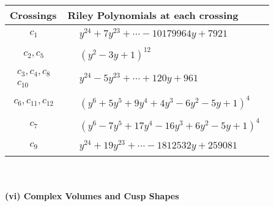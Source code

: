 \documentclass[1p]{elsarticle_modified}
\theoremstyle{definition}
\begin{document}
\begin{tabular}{m{50pt}|m{274pt}}
Crossings & \hspace{64pt}Riley Polynomials at each crossing \\
\hline $$\begin{aligned}c_{1}\end{aligned}$$&$\begin{aligned}
&y^{24}+7 y^{23}+\cdots-10179964 y+7921
\end{aligned}$\\
\hline $$\begin{aligned}c_{2},c_{5}\end{aligned}$$&$\begin{aligned}
&(y^2-3 y+1)^{12}
\end{aligned}$\\
\hline $$\begin{aligned}c_{3},c_{4},c_{8}\\c_{10}\end{aligned}$$&$\begin{aligned}
&y^{24}-5 y^{23}+\cdots+120 y+961
\end{aligned}$\\
\hline $$\begin{aligned}c_{6},c_{11},c_{12}\end{aligned}$$&$\begin{aligned}
&(y^6+5 y^5+9 y^4+4 y^3-6 y^2-5 y+1)^4
\end{aligned}$\\
\hline $$\begin{aligned}c_{7}\end{aligned}$$&$\begin{aligned}
&(y^6-7 y^5+17 y^4-16 y^3+6 y^2-5 y+1)^4
\end{aligned}$\\
\hline $$\begin{aligned}c_{9}\end{aligned}$$&$\begin{aligned}
&y^{24}+19 y^{23}+\cdots-1812532 y+259081
\end{aligned}$\\
\hline
\end{tabular}\\~\\
\newpage\flushleft \textbf{(vi) Complex Volumes and Cusp Shapes}
\end{document}

